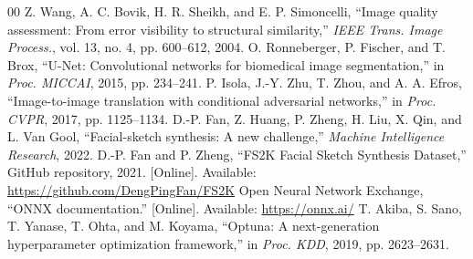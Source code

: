 \documentclass[conference]{IEEEtran}
\begin{document}
\begin{thebibliography}{00}
 Z. Wang, A. C. Bovik, H. R. Sheikh, and E. P. Simoncelli, ``Image quality assessment: From error visibility to structural similarity,'' \emph{IEEE Trans. Image Process.}, vol. 13, no. 4, pp. 600--612, 2004.
 O. Ronneberger, P. Fischer, and T. Brox, ``U-Net: Convolutional networks for biomedical image segmentation,'' in \emph{Proc. MICCAI}, 2015, pp. 234--241.
 P. Isola, J.-Y. Zhu, T. Zhou, and A. A. Efros, ``Image-to-image translation with conditional adversarial networks,'' in \emph{Proc. CVPR}, 2017, pp. 1125--1134.
 D.-P. Fan, Z. Huang, P. Zheng, H. Liu, X. Qin, and L. Van Gool, ``Facial-sketch synthesis: A new challenge,'' \emph{Machine Intelligence Research}, 2022.
 D.-P. Fan and P. Zheng, ``FS2K Facial Sketch Synthesis Dataset,'' GitHub repository, 2021. [Online]. Available: \url{https://github.com/DengPingFan/FS2K}
 Open Neural Network Exchange, ``ONNX documentation.'' [Online]. Available: \url{https://onnx.ai/}
 T. Akiba, S. Sano, T. Yanase, T. Ohta, and M. Koyama, ``Optuna: A next-generation hyperparameter optimization framework,'' in \emph{Proc. KDD}, 2019, pp. 2623--2631.
\end{thebibliography}
\end{document}
